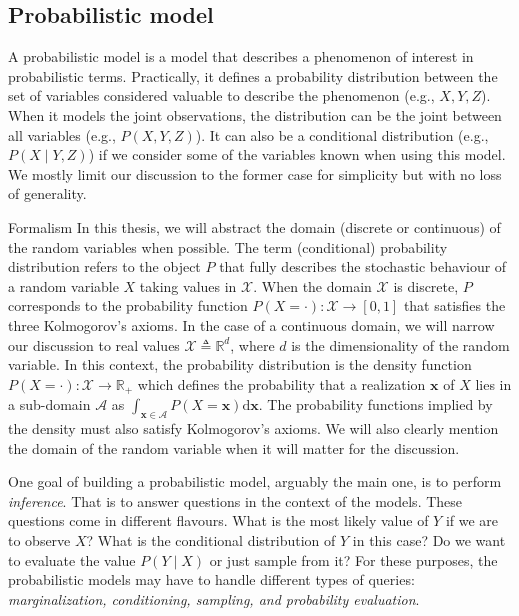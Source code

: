 \subsection{Probabilistic model}
A probabilistic model is a model that describes a phenomenon of interest in probabilistic terms. Practically, it defines a probability distribution between the set of variables considered valuable to describe the phenomenon (e.g., $X, Y, Z$). When it models the joint observations, the distribution can be the joint between all variables (e.g., $P(X, Y, Z)$). It can also be a conditional distribution  (e.g., $P(X \mid Y, Z)$) if we consider some of the variables known when using this model. We mostly limit our discussion to the former case for simplicity but with no loss of generality.

\begin{side_note}{Formalism}
  In this thesis, we will abstract the domain (discrete or continuous) of the random variables when possible. The term (conditional) probability distribution refers to the object $P$ that fully describes the stochastic behaviour of a random variable $X$ taking values in $\mathcal{X}$. When the domain $\mathcal{X}$ is discrete, $P$ corresponds to the probability function $P(X=\cdot): \mathcal{X} \rightarrow \left[0, 1 \right]$ that satisfies the three Kolmogorov's axioms. In the case of a continuous domain, we will narrow our discussion to real values $\mathcal{X} \triangleq \mathbb{R}^d$, where $d$ is the dimensionality of the random variable. In this context, the probability distribution is the density function $P(X=\cdot): \mathcal{X} \rightarrow \mathbb{R}_{+}$ which defines the probability that a realization $\bm{x}$ of $X$ lies in a sub-domain $\mathcal{A}$ as $\int_{\bm{x} \in \mathcal{A}} P(X=\bm{x}) \text{d} \bm{x}$. The probability functions implied by the density must also satisfy Kolmogorov's axioms. We will also clearly mention the domain of the random variable when it will matter for the discussion.
\end{side_note}

One goal of building a probabilistic model, arguably the main one, is to perform \textit{inference}. That is to answer questions in the context of the models. These questions come in different flavours. What is the most likely value of $Y$ if we are to observe $X$? What is the conditional distribution of $Y$ in this case? Do we want to evaluate the value $P(Y \mid X)$ or just sample from it? For these purposes, the probabilistic models may have to handle different types of queries: \textit{marginalization, conditioning, sampling, and probability evaluation}.

